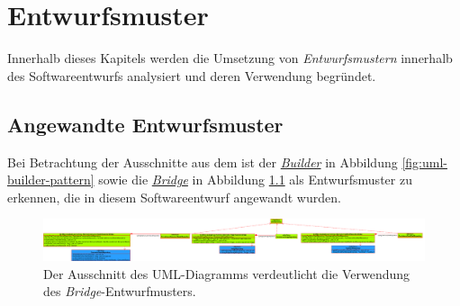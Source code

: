 \chapter{Entwurfsmuster}
\label{entwurfsmuster}
Innerhalb dieses Kapitels werden die Umsetzung von \textit{Entwurfsmustern} innerhalb des Softwareentwurfs analysiert und deren Verwendung begründet.


\section{Angewandte Entwurfsmuster}
Bei Betrachtung der Ausschnitte aus dem \href{https://github.com/lucasmerkel/dhbw-advancedswe-programmentwurf/blob/d5c89113d12c3b877ddc4d6a99225b277ddd468f/Documentation/Bilder/uml-diagramme/klassendiagramm.svg}{} ist der \href{https://github.com/lucasmerkel/dhbw-advancedswe-programmentwurf/blob/2bab7b1c200507e4550ce7025485261d0e95ce07/Documentation/Bilder/uml-diagramme/uml-entwurfsmuster-builder.svg}{\textit{Builder}} in Abbildung \ref{fig:uml-builder-pattern} sowie die \href{https://github.com/lucasmerkel/dhbw-advancedswe-programmentwurf/blob/d5c89113d12c3b877ddc4d6a99225b277ddd468f/Documentation/Bilder/uml-diagramme/uml-entwurfsmuster-bridge.svg}{\textit{Bridge}} in Abbildung \ref{fig:uml-bridge-pattern} als Entwurfsmuster zu erkennen, die in diesem Softwareentwurf angewandt wurden.

\begin{figure}[H]
 	\centering
 	\includegraphics[width=1.0\textwidth]{Bilder/uml-diagramme/entwurfsmuster-bridge.png}
 	\caption[Ausschnitt des UML-Diagramms zur Darstellung des \textit{Bridge}-Entwurfmusters.]{Der Ausschnitt des UML-Diagramms verdeutlicht die Verwendung des \textit{Bridge}-Entwurfmusters.}
 	\label{fig:uml-bridge-pattern}
 \end{figure}

